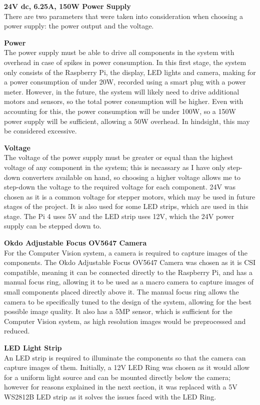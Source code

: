 \vspace{1em}
\noindent
\textbf{24V dc, 6.25A, 150W Power Supply} \\
There are two parameters that were taken into consideration when choosing a power supply: the power output and the voltage.
\begin{mylist}
  \item \textbf{Power} \\
  The power supply must be able to drive all components in the system with overhead in case of spikes in power consumption.
  In this first stage, the system only consists of the Raspberry Pi, the display, LED lights and camera, 
  making for a power consumption of under 20W, recorded using a smart plug with a power meter.
  However, in the future, the system will likely need to drive additional motors and sensors, so the total power consumption
  will be higher. Even with accounting for this, the power consumption will be under 100W, so a 150W power supply will be sufficient,
  allowing a 50W overhead. In hindsight, this may be considered excessive.
  \item \textbf{Voltage} \\
  The voltage of the power supply must be greater or equal than the highest voltage of any component in the system; this is necassary
  as I have only step-down converters available on hand, so choosing a higher voltage allows me to step-down the voltage 
  to the required voltage for each component. 24V was chosen as it is a common voltage for stepper motors, which may be used in
  future stages of the project. It is also used for some LED strips, which are used in this stage. The Pi 4 uses 5V and the LED strip
  uses 12V, which the 24V power supply can be stepped down to.
\end{mylist}

\noindent
\textbf{Okdo Adjustable Focus OV5647 Camera} \\
For the Computer Vision system, a camera is required to capture images of the components. The Okdo Adjustable Focus OV5647 Camera
was chosen as it is CSI compatible, meaning it can be connected directly to the Raspberry Pi, and has a manual focus ring, allowing
it to be used as a macro camera to capture images of small components placed directly above it. The manual focus ring allows the camera
to be specifically tuned to the design of the system, allowing for the best possible image quality. It also
has a 5MP sensor\cite{okdospec}, which is sufficient for the Computer Vision system, as high resolution images would be preprocessed and reduced.

\vspace{1em}
\noindent
\textbf{LED Light Strip} \\
An LED strip is required to illuminate the components so that the camera can capture images of them.
Initially, a 12V LED Ring was chosen as it would allow for a uniform light source and can be mounted directly below the camera; 
however for reasons explained in the next section, it was replaced with a 5V WS2812B LED strip as it solves the issues
faced with the LED Ring.

